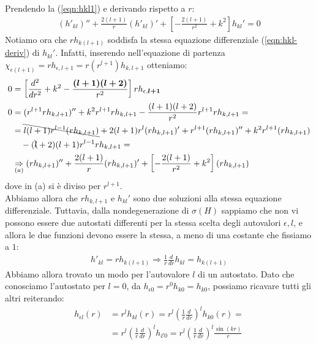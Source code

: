 \documentclass[../../FisicaTeorica.tex]{subfiles}
\begin{document}
Prendendo la (\ref{eqn:hkl1}) e derivando rispetto a $r$:
\begin{align}
(h'_{kl})'' + \frac{2(l+1)}{r}(h'_{kl})' + \left[
-\frac{2(l+1)}{r^2}+k^2
\right] h_{kl}' = 0
\label{eqn:hkl-deriv}
\end{align}
Notiamo ora che $rh_{k(l+1)}$ soddisfa la stessa equazione differenziale (\ref{eqn:hkl-deriv}) di $h_{kl}'$. Infatti, inserendo nell'equazione di partenza $\chi_{\epsilon(l+1)} = rh_{\epsilon,l+1} = r(r^{l+1})h_{k,l+1}$ otteniamo:
\begin{align*}
0 &= \left[\frac{d^2}{dr^2} + k^2 -\frac{\bm{(l+1)(l+2)}}{r^2}\right] rh_{\epsilon,\bm{l+1}}\\
0&= (r^{l+1} r h_{k,l+1})'' + k^2 r^{l+1} rh_{k,l+1} - \frac{(l+1)(l+2)}{r^2} r^{l+1}r h_{k,l+1}=\\
&=\bcancel{l(l+1)r^{l-1}(rh_{k,l+1})} + 2(l+1)r^l (rh_{k,l+1})' + r^{l+1}(r h_{k,l+1})'' + k^2 r^{l+1}(rh_{k,l+1})\\
&\quad - (\bcancel{l}+2)(l+1)r^{l-1}r h_{k,l+1}=\\
&\underset{(a)}{\Rightarrow} (rh_{k,l+1})''+\frac{2(l+1)}{r}(r h_{k,l+1})' + \left[-\frac{2(l+1)}{r^2}+k^2 \right](rh_{k,l+1})
\end{align*}
dove in (a) si è diviso per $r^{l+1}$.\\
Abbiamo allora che $rh_{k,l+1}$ e $h_{kl}'$ sono due soluzioni alla stessa equazione differenziale. Tuttavia, dalla nondegenerazione di $\sigma(H)$ sappiamo che non vi possono essere due autostati differenti per la stessa scelta degli autovalori $\epsilon, l$, e allora le due funzioni devono essere la stessa, a meno di una costante che fissiamo a $1$:
\begin{align*}
h'_{kl} = r h_{k(l+1)} \Rightarrow  \frac{1}{r} \frac{d}{dr} h_{kl} =h_{k(l+1)}
\end{align*}
Abbiamo allora trovato un modo per  l'autovalore $l$ di un autostato. Dato che conosciamo l'autostato per $l=0$, da $h_{\epsilon 0} = r^0 h_{k0} = h_{k0}$, possiamo ricavare tutti gli altri reiterando:
\begin{align*}
h_{\epsilon l}(r) &= r^l h_{kl}(r) = r^l \left( 
\frac{1}{r} \frac{d}{dr}
\right)^l h_{k0}(r) =\\
&= r^l \left( \frac{1}{r} \frac{d}{dr}\right)^l h_{\mathcal{E}0} = r^l \left(\frac{1}{r}\frac{d}{dr}\right)^l \frac{\sin(kr)}{r}
\end{align*}
\end{document}
